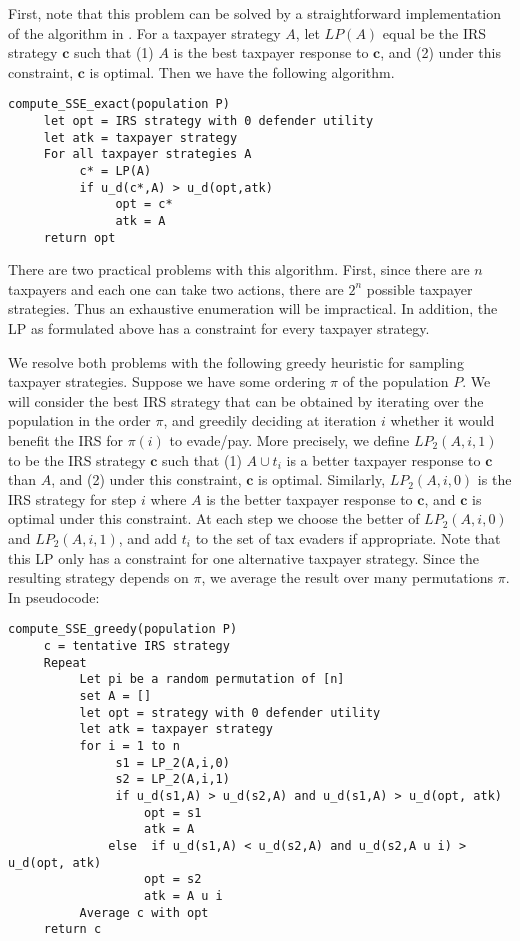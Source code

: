 \documentclass[paper=letter, fontsize=11pt]{article}
\begin{document}
First, note that this problem can be solved by a straightforward implementation of the algorithm in \cite{conitzer2006computing}. For a taxpayer strategy $A$, let $LP(A)$ equal be the IRS strategy $\bm{c}$ such that (1) $A$ is the best taxpayer response to $\bm{c}$, and (2) under this constraint, $\bm{c}$ is optimal. Then we have the following algorithm.

\begin{verbatim}
compute_SSE_exact(population P)
     let opt = IRS strategy with 0 defender utility
     let atk = taxpayer strategy
     For all taxpayer strategies A
          c* = LP(A)
          if u_d(c*,A) > u_d(opt,atk)
               opt = c*
               atk = A
     return opt
\end{verbatim}

There are two practical problems with this algorithm. First, since there are $n$ taxpayers and each one can take two actions, there are $2^n$ possible taxpayer strategies. Thus an exhaustive enumeration will be impractical. In addition, the LP as formulated above has a constraint for every taxpayer strategy.

We resolve both problems with the following greedy heuristic for sampling taxpayer strategies. Suppose we have some ordering $\pi$ of the population $P$. We will consider the best IRS strategy that can be obtained by iterating over the population in the order $\pi$, and greedily deciding at iteration $i$ whether it would benefit the IRS for $\pi(i)$ to evade/pay. More precisely, we define $LP_2(A, i, 1)$ to be the IRS strategy $\bm{c}$ such that (1) $A \cup t_i$ is a better taxpayer response to $\bm{c}$ than $A$, and (2) under this constraint, $\bm{c}$ is optimal. Similarly, $LP_2(A, i, 0)$ is the IRS strategy for step $i$ where $A$ is the better taxpayer response to $\bm{c}$, and $\bm{c}$ is optimal under this constraint. At each step we choose the better of $LP_2(A,i,0)$ and $LP_2(A,i,1)$, and add $t_i$ to the set of tax evaders if appropriate. Note that this LP only has a constraint for one alternative taxpayer strategy. Since the resulting strategy depends on $\pi$, we average the result over many permutations $\pi$. In pseudocode:

\begin{verbatim}
compute_SSE_greedy(population P)
     c = tentative IRS strategy
     Repeat
          Let pi be a random permutation of [n]
          set A = []
          let opt = strategy with 0 defender utility
          let atk = taxpayer strategy
          for i = 1 to n
               s1 = LP_2(A,i,0)
               s2 = LP_2(A,i,1)
               if u_d(s1,A) > u_d(s2,A) and u_d(s1,A) > u_d(opt, atk)
                   opt = s1
                   atk = A
              else  if u_d(s1,A) < u_d(s2,A) and u_d(s2,A u i) > u_d(opt, atk)
                   opt = s2
                   atk = A u i
          Average c with opt
     return c
\end{verbatim}
\end{document}
